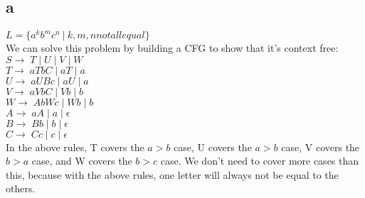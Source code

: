\documentclass[10pt,letterpaper]{article}
\begin{document}
\section{}
\subsection*{a}
$L=\{a^kb^mc^n\ |\ k,m,n not all equal\}$\\
We can solve this problem by building a CFG to show that it's context free:\\
$S \rightarrow\;T \;| \;U \;| \;V \;| \;W \;$\\
$T \rightarrow\;aTbC \;| \;aT \;| \;a$\\ %
$U \rightarrow\;aUBc \;| \;aU \;| \;a$\\ %
$V \rightarrow \;aVbC \;| \;Vb \;| \;b$\\ %
$W \rightarrow \;AbWc \;| \;Wb \;| \;b$\\ %
$A \rightarrow \;aA \;| \;a \;| \;\epsilon$ \\
$B \rightarrow \;Bb \;| \;b \;|\; \epsilon$ \\
$C \rightarrow \;Cc \;| \;c \;| \;\epsilon$ \\
In the above rules, T covers the $a > b$ case, U covers the $a > b$ case, V
covers the $b > a$ case, and W covers the $b > c$ case. We don't need to cover
more cases than this, because with the above rules, one letter will always not
be equal to the others.
\end{document}
